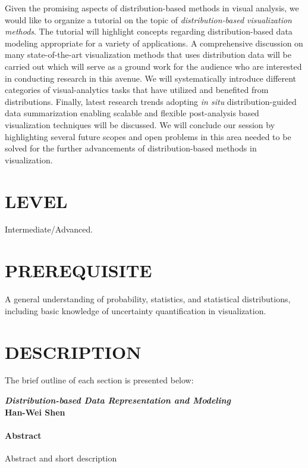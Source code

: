 \documentclass[preprint,journal]{vgtc}       %
\newcommand{\addverticalspace}{\vspace{3mm}}
\begin{document}
Given the promising aspects of distribution-based methods in visual analysis, we would like to organize a tutorial on the topic of \textit{distribution-based visualization methods}. The tutorial will highlight concepts regarding distribution-based data modeling appropriate for a variety of applications. A comprehensive discussion on many state-of-the-art visualization methods that uses distribution data will be carried out which will serve as a ground work for the audience who are interested in conducting research in this avenue. We will systematically introduce different categories of visual-analytics tasks that have utilized and benefited from distributions. Finally, latest research trends adopting \textit{in situ} distribution-guided data summarization enabling scalable and flexible post-analysis based visualization techniques will be discussed. We will conclude our session by highlighting several future scopes and open problems in this area needed to be solved for the further advancements of distribution-based methods in visualization.

\section*{LEVEL}
Intermediate/Advanced.

\section*{PREREQUISITE}
A general understanding of probability, statistics, and statistical distributions, including basic knowledge of uncertainty quantification in visualization.


\section*{DESCRIPTION}
The brief outline of each section is presented below:

\addverticalspace

\noindent\textbf{\textit{Distribution-based Data Representation and Modeling}}\\
\textbf{Han-Wei Shen}
\paragraph{Abstract}
Abstract and short description
\end{document}
